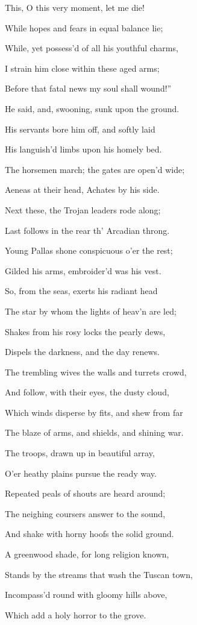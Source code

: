 This, O this very moment, let me die!

While hopes and fears in equal balance lie;

While, yet possess’d of all his youthful charms,

I strain him close within these aged arms;

Before that fatal news my soul shall wound!”

He said, and, swooning, sunk upon the ground.

His servants bore him off, and softly laid

His languish’d limbs upon his homely bed.

The horsemen march; the gates are open’d wide;

Aeneas at their head, Achates by his side.

Next these, the Trojan leaders rode along;

Last follows in the rear th’ Arcadian throng.

Young Pallas shone conspicuous o’er the rest;

Gilded his arms, embroider’d was his vest.

So, from the seas, exerts his radiant head

The star by whom the lights of heav’n are led;

Shakes from his rosy locks the pearly dews,

Dispels the darkness, and the day renews.

The trembling wives the walls and turrets crowd,

And follow, with their eyes, the dusty cloud,

Which winds disperse by fits, and shew from far

The blaze of arms, and shields, and shining war.

The troops, drawn up in beautiful array,

O’er heathy plains pursue the ready way.

Repeated peals of shouts are heard around;

The neighing coursers answer to the sound,

And shake with horny hoofs the solid ground.

A greenwood shade, for long religion known,

Stands by the streams that wash the Tuscan town,

Incompass’d round with gloomy hills above,

Which add a holy horror to the grove.


